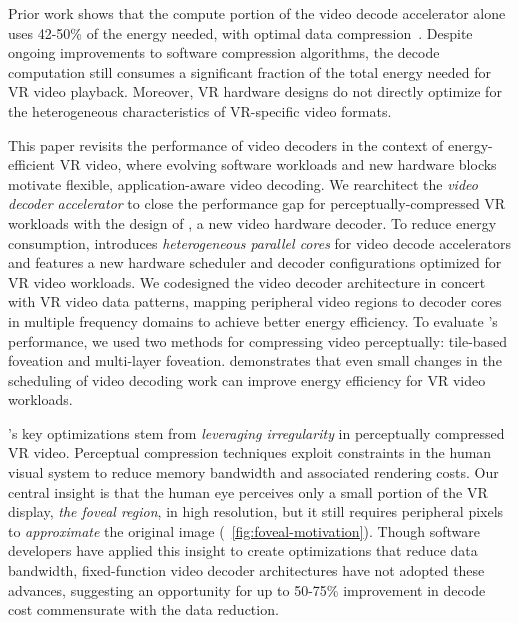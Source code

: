 Prior work shows that the compute portion of the video decode accelerator alone uses 42-50\% of the energy needed,  with optimal data compression~\cite{google2018asplos, tikekar18ijssc, 8khevc-ijssc}.
Despite ongoing improvements to software compression algorithms, the decode computation still consumes a significant fraction of the total energy needed for VR video playback.
Moreover, VR hardware designs do not directly optimize for the heterogeneous characteristics of VR-specific video formats.

This paper revisits the performance of video decoders in the context of energy-efficient VR video, where evolving software workloads and new hardware blocks motivate flexible, application-aware video decoding.
We rearchitect the \emph{video decoder accelerator} to close the performance gap for perceptually-compressed VR workloads with the design of \nameArch, a new video hardware decoder.
To reduce energy consumption, \nameArch introduces \emph{heterogeneous parallel cores} for video decode accelerators and features a new hardware scheduler and decoder configurations optimized for VR video workloads.
We codesigned the video decoder architecture in concert with VR video data patterns, mapping peripheral video regions to decoder cores in multiple frequency domains to achieve better energy efficiency.
To evaluate \nameArch's performance, we used two methods for compressing video perceptually: tile-based foveation and multi-layer foveation.
\nameArch demonstrates that even small changes in the scheduling of video decoding work can improve energy efficiency for VR video workloads.

\nameArch's key optimizations stem from \emph{leveraging irregularity} in perceptually compressed VR video.
Perceptual compression techniques exploit constraints in the human visual system to reduce memory bandwidth and associated rendering costs.
Our central insight is that the human eye perceives only a small portion of the VR display, \emph{the foveal region}, in high resolution, but it still requires peripheral pixels to \emph{approximate} the original image (~\ref{fig:foveal-motivation}).
Though software developers have applied this insight to create optimizations that reduce data bandwidth, fixed-function video decoder architectures have not adopted these advances, suggesting an opportunity for up to 50-75\% improvement in decode cost commensurate with the data reduction.

